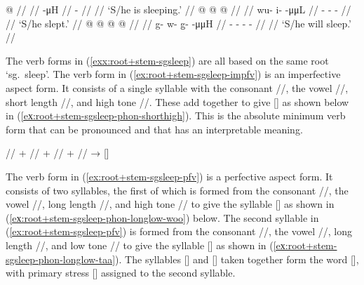 \pex\label{exx:root+stem-sgsleep}%
\a\label{ex:root+stem-sgsleep-impfv}%
%
\begingl
	\gla	{} @ {} //
	\glp	\llap{[}\rlap{\ipa{\gm{tʰá}}]} {} //
	\glb	{} -μH //
	\glc	{} - //
	\gld	{} {} //
	\glft	‘S/he is sleeping.’
		//
\endgl
\a\label{ex:root+stem-sgsleep-pfv}%
%
\begingl
	\gla	{} @ {} @ {} @ {} //
	\glp	\llap{[}\rlap{\ipa{wùː.ˈ\gm{tʰàː}}]} {} {} {} //
	\glb	wu- i-  -μμL //
	\glc	{}- -  - //
	\gld	{} {} {} {} //
	\glft	‘S/he slept.’
		//
\endgl
\a\label{ex:root+stem-sgsleep-prsp}%
%
\begingl
	\gla	{} @ {} @ {} @ {} @ {} //
	\glp	\llap{[}\rlap{\ipa{kʷùː.qà.ˈ\gm{tʰáː}}]} {} {} {} {} //
	\glb	g- w- g̱-  -μμH //
	\glc	{}- - -  - //
	\gld	{} {} {} {} {} //
	\glft	‘S/he will sleep.’
		//
\endgl
\xe

The verb forms in (\ref{exx:root+stem-sgsleep}) are all based on the same root  ‘sg.\ sleep’.
The verb form in (\ref{ex:root+stem-sgsleep-impfv}) is an imperfective aspect form.
It consists of a single syllable with the consonant //, the vowel //, short length //, and high tone //.
These add together to give [] as shown below in (\ref{eх:root+stem-sgsleep-phon-shorthigh}).
This is the absolute minimum verb form that can be pronounced and that has an interpretable meaning.

\ex\label{eх:root+stem-sgsleep-phon-shorthigh}%
%
	// + // + // + //
	→ []
\xe

The verb form in (\ref{ex:root+stem-sgsleep-pfv}) is a perfective aspect form.
It consists of two syllables, the first of which is formed from the consonant //, the vowel //, long length //, and high tone // to give the syllable [] as shown in (\ref{eх:root+stem-sgsleep-phon-longlow-woo}) below.
The second syllable in (\ref{ex:root+stem-sgsleep-pfv}) is formed from the consonant //, the vowel //, long length //, and low tone // to give the syllable [] as shown in (\ref{eх:root+stem-sgsleep-phon-longlow-taa}).
The syllables [] and [] taken together form the word [], with primary stress [] assigned to the second syllable.

